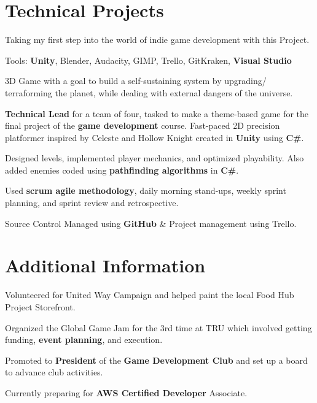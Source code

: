 \documentclass[]{pratham-resume-openfont}
\begin{document}
\begin{minipage}[t]{0.65\textwidth}

\section{Technical Projects}
Taking my first step into the world of indie game development with this Project.
\begin{tightemize}
    \item Tools: {\bf Unity}, Blender, Audacity, GIMP, Trello, GitKraken, {\bf Visual Studio}
    \item 3D Game with a goal to build a self-sustaining system by upgrading/ terraforming the planet, while dealing with external dangers of the universe.
\end{tightemize}
\sectionsep

\begin{tightemize}
    \item {\bf Technical Lead} for a team of four, tasked to make a theme-based game for the final project of the {\bf game development} course. Fast-paced 2D precision platformer inspired by Celeste and Hollow Knight created in {\bf Unity} using {\bf C\#}.
    \item Designed levels, implemented player mechanics, and optimized playability. Also added enemies coded using {\bf pathfinding algorithms} in {\bf C\#}.
    \item Used {\bf scrum agile methodology}, daily morning stand-ups, weekly sprint planning, and sprint review and retrospective.
    \item Source Control Managed using {\bf GitHub} \& Project management using Trello.
\end{tightemize}  
\sectionsep

\end{minipage} 


\section{Additional Information}
\vspace{\topsep} %
\begin{tightemize}
    \item Volunteered for United Way Campaign and helped paint the local Food Hub Project Storefront.
    \item Organized the Global Game Jam for the 3rd time at TRU which involved getting funding, {\bf event planning}, and execution.
    \item Promoted to {\bf President} of the {\bf Game Development Club} and set up a board to advance club activities.
    \item Currently preparing for {\bf AWS Certified Developer} Associate.
\end{tightemize}
\end{document}
